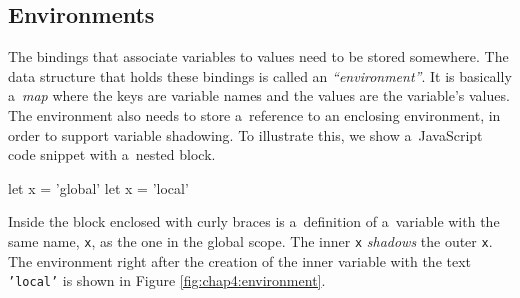 \subsection{Environments}
The bindings that associate variables to values need to be stored somewhere. The data structure that holds these bindings is called an \emph{``environment''}.
It is basically a~\emph{map} where the keys are variable names and the values are the variable’s values. The environment also needs to store a~reference
to an enclosing environment, in order to support variable shadowing. To illustrate this, we show a~JavaScript code snippet with a~nested block.
\begin{code}
let x = 'global'
{
    let x = 'local'
}
\end{code}
Inside the block enclosed with curly braces is a~definition of a~variable with the same name, \texttt{x}, as the one in the global scope. The inner \texttt{x}
\emph{shadows} the outer \texttt{x}. The environment right after the creation of the inner variable with the text \texttt{'local'} is shown in Figure
\ref{fig:chap4:environment}.

